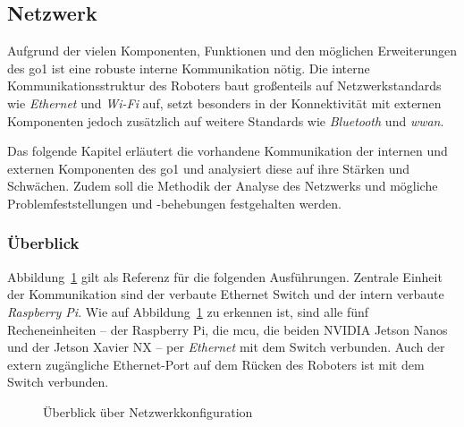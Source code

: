 \subsection{Netzwerk}
\label{subsec:netzwerk}

Aufgrund der vielen Komponenten, Funktionen und den möglichen Erweiterungen des \gls{go1} ist eine robuste interne Kommunikation nötig.
Die interne Kommunikationsstruktur des Roboters baut großenteils auf Netzwerkstandards wie \emph{Ethernet} und \emph{Wi-Fi} auf,
setzt besonders in der Konnektivität mit externen Komponenten jedoch zusätzlich auf weitere Standards wie \emph{Bluetooth} und \emph{\gls{wwan}}.

Das folgende Kapitel erläutert die vorhandene Kommunikation der internen und externen Komponenten des \gls{go1} und analysiert diese
auf ihre Stärken und Schwächen.
Zudem soll die Methodik der Analyse des Netzwerks und mögliche Problemfeststellungen und -behebungen festgehalten werden.

\subsubsection{Überblick}
\label{subsubsec:netzwerk_ueberblick}

Abbildung~\ref{fig:netzwerk_ueberblick} gilt als Referenz für die folgenden Ausführungen.
Zentrale Einheit der Kommunikation sind der verbaute Ethernet Switch und
der intern verbaute \emph{Raspberry Pi}.
Wie auf Abbildung~\ref{fig:netzwerk_ueberblick} zu erkennen ist, sind alle fünf Recheneinheiten --
der Raspberry Pi, die \gls{mcu}, die beiden NVIDIA Jetson Nanos und der Jetson Xavier NX --
per \emph{Ethernet} mit dem Switch verbunden.
Auch der extern zugängliche Ethernet-Port auf dem Rücken des Roboters ist mit dem Switch verbunden.

\begin{figure}[h]
    \caption{Überblick über Netzwerkkonfiguration}\label{fig:netzwerk_ueberblick}
\end{figure}

